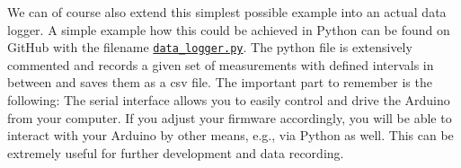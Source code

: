 We can of course also extend this simplest possible example into an actual data logger. A simple example how this could be achieved in Python can be found on GitHub with the filename \href{https://github.com/galactic-forensics/workshop_arduino_electronics/blob/main/further_examples/data_logger/data_logger.py}{\lstinline{data_logger.py}}. The python file is extensively commented and records a given set of measurements with defined intervals in between and saves them as a \ac{csv} file. The important part to remember is the following: The serial interface allows you to easily control and drive the Arduino from your computer. If you adjust your firmware accordingly, you will be able to interact with your Arduino by other means, e.g., via Python as well. This can be extremely useful for further development and data recording.